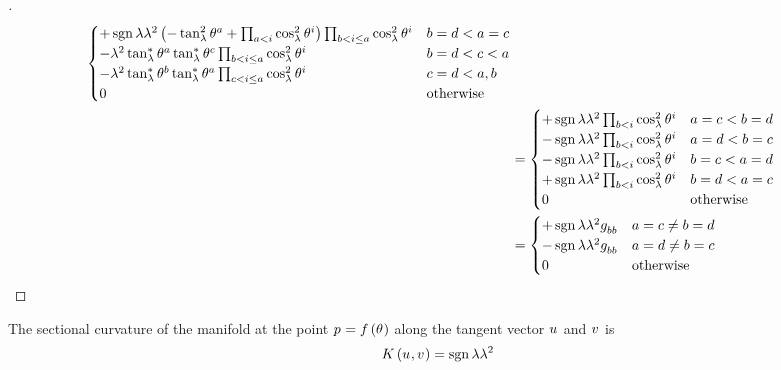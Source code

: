 \documentclass[../main.tex]{subfiles}
\begin{document}
\begin{proof}[]
\begin{align*}
\begin{cases}
+\sign{\lambda}\lambda^2
\left(
-\tan_\lambda^2\tensor{\theta}{^a}
+\prod_{a<i}\cos_\lambda^2\tensor{\theta}{^i}
\right)
\prod_{b<i\le a}\cos_\lambda^2\tensor{\theta}{^i}
&\text{$b=d<a=c$}\\
-\lambda^2\tan_\lambda^\ast\tensor{\theta}{^a}\tan_\lambda^\ast\tensor{\theta}{^c}\prod_{b<i\le a}{\cos_\lambda^2\tensor{\theta}{^i}}
&\text{$b=d<c<a$}\\
-\lambda^2\tan_\lambda^\ast\tensor{\theta}{^b}\tan_\lambda^\ast\tensor{\theta}{^a}\prod_{c<i\le a}\cos_\lambda^2\tensor{\theta}{^i}
&\text{$c=d<a,b$}\\
0&\text{otherwise}\\
\end{cases}\\
&=\begin{cases}
+\sign{\lambda}\lambda^2
\prod_{b<i}\cos_\lambda^2\tensor{\theta}{^i}
&\text{$a=c<b=d$}\\
-\sign{\lambda}\lambda^2
\prod_{b<i}\cos_\lambda^2\tensor{\theta}{^i}
&\text{$a=d<b=c$}\\
-\sign{\lambda}\lambda^2
\prod_{b<i}\cos_\lambda^2\tensor{\theta}{^i}
&\text{$b=c<a=d$}\\
+\sign{\lambda}\lambda^2
\prod_{b<i}\cos_\lambda^2\tensor{\theta}{^i}
&\text{$b=d<a=c$}\\
0&\text{otherwise}\\
\end{cases} \\
&=\begin{cases}
+\sign{\lambda}\lambda^2\tensor{g}{_b_b}
&\text{$a=c\ne b=d$}\\
-\sign{\lambda}\lambda^2\tensor{g}{_b_b}
&\text{$a=d\ne b=c$}\\
0&\text{otherwise}\\
\end{cases}\qedhere
\end{align*}
\end{proof}
\begin{lemma}\label{M:SectionalCurvature}
The sectional curvature of the manifold
at the point $\tensor{p}{}=f\left(\tensor{\theta}{}\right)$
along the tangent vector $\tensor{u}{}$ and $\tensor{v}{}$
is
\begin{equation*}
K\left(\tensor{u}{},\tensor{v}{}\right)=\sign{\lambda}\lambda^2
\end{equation*}
\end{lemma}
\end{document}

